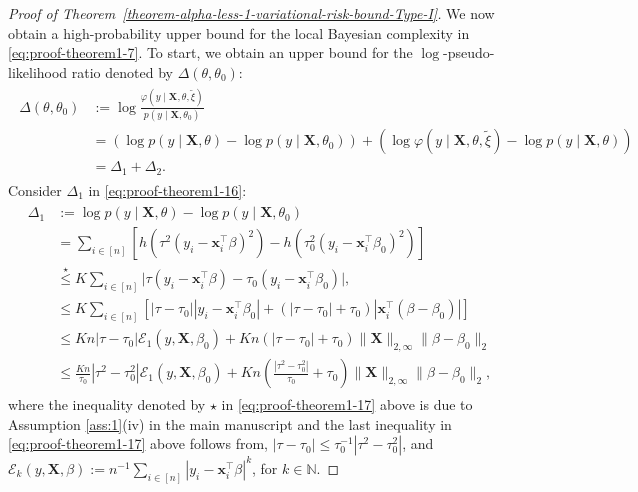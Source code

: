 \documentclass[12pt]{article}
\numberwithin{equation}{section}
\begin{document}
\begin{proof}[Proof of Theorem~\ref{theorem-alpha-less-1-variational-risk-bound-Type-I}]
We now obtain a high-probability upper bound for the local Bayesian complexity in \eqref{eq:proof-theorem1-7}. To start, we obtain an upper bound for the $\log$-pseudo-likelihood ratio denoted by $\Delta(\theta, \theta_0)$:
\begin{align}\label{eq:proof-theorem1-16}
    \begin{split}
        \Delta(\theta, \theta_0) &:= \log \frac{\varphi(y\mid \mathbf{X}, \theta, \tilde{\xi})}{p(y\mid \mathbf{X}, \theta_0)}\\
        &= \left(\log p(y\mid \mathbf{X}, \theta) - \log p(y\mid \mathbf{X}, \theta_0)\right) + \left(\log \varphi(y\mid \mathbf{X}, \theta, \tilde{\xi}) - \log p(y\mid \mathbf{X}, \theta)\right)\\
        &= \Delta_1 +\Delta_2.
    \end{split}
\end{align}
Consider $\Delta_1$ in \eqref{eq:proof-theorem1-16}:
\begin{align}\label{eq:proof-theorem1-17}
    \begin{split}
        \Delta_1 &:= \log p(y\mid \mathbf{X}, \theta) - \log p(y\mid \mathbf{X}, \theta_0)\\
        &= \sum_{i\in [n]}\left[h\left(\tau^2(y_i - \mathbf{x}_i^{\top}\beta)^2\right) - h\left(\tau_0^2(y_i-\mathbf{x}_i^{\top}\beta_0)^2\right)\right]\\
        &\stackrel{\star}{\leq} K\sum_{i\in [n]}\Big|\tau(y_i - \mathbf{x}_i^{\top}\beta) - \tau_0(y_i-\mathbf{x}_i^{\top}\beta_0)\Big|,\\
        &\leq K \sum_{i\in [n]} \left[|\tau-\tau_0||y_i-\mathbf{x}_i^{\top}\beta_0| + \left(|\tau-\tau_0| + \tau_0\right)|\mathbf{x}_i^{\top}(\beta-\beta_0)|\right]\\
        &\leq K n |\tau-\tau_0| \mathcal{E}_1(y, \mathbf{X}, \beta_0) + Kn\left(|\tau-\tau_0| + \tau_0\right)\lVert \mathbf{X}\rVert_{2, \infty}\lVert \beta-\beta_0\rVert_2\\
        &\leq \frac{Kn}{\tau_0}|\tau^2-\tau_0^2|\mathcal{E}_1(y, \mathbf{X}, \beta_0) + Kn\left(\frac{|\tau^2-\tau_0^2|}{\tau_0} + \tau_0\right) \lVert \mathbf{X}\rVert_{2, \infty}\lVert \beta-\beta_0\rVert_2,
    \end{split}
\end{align}
where the inequality denoted by $\star$ in \eqref{eq:proof-theorem1-17} above is due to Assumption \ref{ass:1}(iv) in the main manuscript and the last inequality in \eqref{eq:proof-theorem1-17} above follows from, $|\tau-\tau_0| \leq \tau_0^{-1}|\tau^2-\tau_0^2|$, and $\mathcal{E}_k(y, \mathbf{X}, \beta) := n^{-1}\sum_{i \in [n]}|y_i - \mathbf{x}_i^{\top}\beta|^k$, for $k\in \mathbb{N}$. 


\end{proof}
\end{document}
